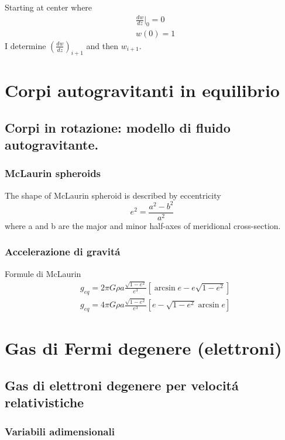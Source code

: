  Starting at center where
 \begin{align*}
 &\frac{dw}{dz}|_0=0\\
 &w(0)=1
 \end{align*}
I determine $(\frac{dw}{dz})_{i+1}$ and then $w_{i+1}$.
 
 
\chapter{Corpi autogravitanti in equilibrio}
\PartialToc


\section{Corpi in rotazione: modello di fluido autogravitante.}
 
\subsection{McLaurin spheroids}

The shape of McLaurin spheroid is described by eccentricity
\begin{equation*}
e^2=\frac{a^2-b^2}{a^2}
\end{equation*}
where a and b are the major and minor half-axes of meridional cross-section.
 
\subsection{Accelerazione di gravit\'a}

Formule di McLaurin
\begin{align*}
&g_{eq}=2\pi G\rho a \frac{\sqrt{1-e^2}}{e^3}[\arcsin{e}-e\sqrt{1-e^2}]\\
&g_{eq}=4\pi G\rho a \frac{\sqrt{1-e^2}}{e^3}[e-\sqrt{1-e^2}\arcsin{e}]
\end{align*}

 
\chapter{Gas di Fermi degenere (elettroni)}
\PartialToc


\section{Gas di elettroni degenere per velocit\'a relativistiche}
 
\subsection{Variabili adimensionali}


